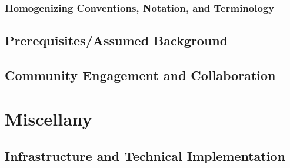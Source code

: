 \subsubsection{Homogenizing Conventions, Notation, and Terminology}\label{subsubsection-homogenizing-conventions-notation-and-terminology}
\subsection{Prerequisites/Assumed Background}\label{subsection-prerequisites-assumed-background}
\subsection{Community Engagement and Collaboration}\label{subsection-community-engagement-and-collaboration}
\section{Miscellany}\label{section-miscellany}
\subsection{Infrastructure and Technical Implementation}\label{subsection-infrastructure-and-technical-implementation}
\begin{appendices}

\end{appendices}

